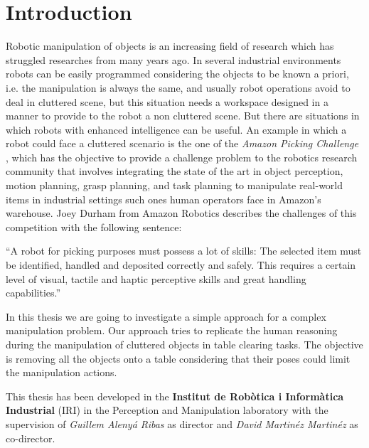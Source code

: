 \chapter{Introduction}
\label{ch:introduction}

Robotic manipulation of objects is an increasing field of research which has struggled researches from many years ago. In several industrial environments robots can be easily programmed considering the objects to be known a priori, i.e. the manipulation is always the same, and usually robot operations avoid to deal in cluttered scene, but this situation needs a workspace designed in a manner to provide to the robot a non cluttered scene. But there are situations in which robots with enhanced intelligence can be useful.
 An example in which a robot could face a cluttered scenario is the one of the \textit{Amazon Picking Challenge} \citep{APC}, which has the objective to provide a challenge problem to the robotics research community that involves integrating the state of the art in object perception, motion planning, grasp planning, and task planning to manipulate real-world items in industrial settings such ones human operators face in Amazon's warehouse. Joey Durham from Amazon Robotics describes the challenges of this competition with the following sentence:
\begin{displayquote}
 “A robot for picking purposes must possess a lot of skills: The selected item must be identified, handled and deposited correctly and safely. This requires a certain level of visual, tactile and haptic perceptive skills and great handling capabilities.”
\end{displayquote}

In this thesis we are going to investigate a simple approach for a complex manipulation problem. Our approach tries to replicate the human reasoning during the manipulation of cluttered objects in table clearing tasks. The objective is removing all the objects onto a table considering that their poses could limit the manipulation actions. 

This thesis has been developed in the \textbf{Institut de Robòtica i Informàtica Industrial} (IRI) in the  Perception and Manipulation laboratory with the supervision of \textit{Guillem Alenyá Ribas} as director and \textit{David Martinéz Martinéz} as co-director. 

